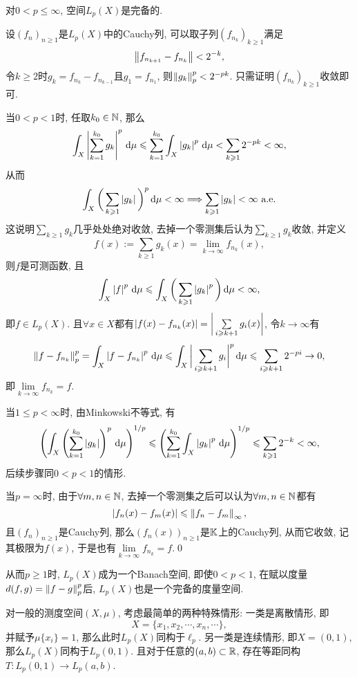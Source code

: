 	\begin{Theorem}
	对$ 0<p\leqslant\infty $, 空间$ L_p(X) $是完备的.
	\end{Theorem}
	\begin{Proof}
	设$ (f_n)_{n\geqslant 1} $是$ L_p(X) $中的Cauchy列, 可以取子列$ (f_{n_k})_{k\geqslant 1} $满足
	\[
	\left\| f_{n_{k+1}}-f_{n_k} \right\|<2^{-k},
	\]
	令$ k\geqslant 2 $时$ g_k=f_{n_k}-f_{n_{k-1}} $且$ g_1=f_{n_1} $, 则$ \left\| g_k \right\|_p^p<2^{-pk} $. 只需证明$ (f_{n_k})_{k\geqslant 1} $收敛即可.
	
	当$ 0<p<1 $时, 任取$ k_0\in\mathbb{N} $, 那么
	\[
	\int_X\left| \sum_{k=1}^{k_0}g_k \right| ^p\,\mathrm{d}\mu\leqslant\sum_{k=1}^{k_0}\int_X\left| g_k \right| ^p\,\mathrm{d}\mu<\sum_{k\geqslant 1}2^{-pk}<\infty,
	\]
	从而
	\[
	\int_X\bigg(\sum_{k\geqslant 1}\left| g_k \right| \bigg)^p\,\mathrm{d}\mu<\infty\Longrightarrow\sum_{k\geqslant 1}\left| g_k \right| <\infty\ \text{a.e.}
	\]
	这说明$ \sum\limits_{k\geqslant 1}g_k $几乎处处绝对收敛, 去掉一个零测集后认为$ \sum\limits_{k\geqslant 1}g_{k} $收敛, 并定义
	\[
	f(x):=\sum_{k\geqslant 1}g_k(x)=\lim_{k\to\infty}f_{n_k}(x),
	\]
	则$ f $是可测函数, 且
	\[
	\int_X\left| f \right| ^p\,\mathrm{d}\mu\leqslant\int_X\bigg(\sum_{k\geqslant 1}\left| g_k \right| ^p\bigg)\,\mathrm{d} \mu<\infty,
	\]
	即$ f\in L_p(X) $. 且$ \forall x\in X $都有$ \left| f(x)-f_{n_k}(x) \right| =\bigg|\sum\limits_{i\geqslant k+1}g_i(x)\bigg| $, 令$ k\to\infty $有
	\[
	\left\| f-f_{n_k} \right\|_p^p=\int_X\left| f-f_{n_k} \right| ^p\,\mathrm{d}\mu\leqslant\int_X\bigg|\sum_{i\geqslant k+1}g_i\bigg|^p\,\mathrm{d}\mu\leqslant\sum_{i\geqslant k+1}2^{-pi}\to 0,
	\]
	即$ \lim\limits_{k\to\infty}f_{n_{k}}=f $.
	
	当$ 1\leqslant p<\infty $时, 由Minkowski不等式, 有
	\[
	\left( \int_X\left( \sum_{k=1}^{k_0}\left| g_k \right|  \right)^p\,\mathrm{d}\mu \right)^{1/p}\leqslant\left( \sum_{k=1}^{k_0}\int_X\left| g_k \right| ^p\,\mathrm{d}\mu \right)^{1/p}\leqslant\sum_{k\geqslant 1}2^{-k}<\infty,
	\]
	后续步骤同$ 0<p<1 $的情形.
	
	当$ p=\infty $时, 由于$ \forall m,n\in\mathbb{N} $, 去掉一个零测集之后可以认为$ \forall m,n\in\mathbb{N} $都有
	\[
	\left| f_n(x)-f_m(x) \right| \leqslant\left\| f_n-f_m \right\|_\infty,
	\]
	且$ (f_n)_{n\geqslant 1} $是Cauchy列, 那么$ (f_n(x))_{n\geqslant 1} $是$ \mathbb{K} $上的Cauchy列, 从而它收敛, 记其极限为$ f(x) $, 于是也有$ \lim\limits_{k\to\infty}f_{n_k}=f $.\qed
	\end{Proof}
	
     从而$ p\geqslant 1 $时, $ L_p(X) $成为一个Banach空间, 即使$ 0<p<1 $, 在赋以度量$ d(f,g)=\left\| f-g \right\|_p^p $后, $ L_p(X) $也是一个完备的度量空间.
     
     对一般的测度空间$ (X,\mu) $, 考虑最简单的两种特殊情形: 一类是离散情形, 即
	\[
	X=\{ x_1,x_2,\cdots,x_n,\cdots \},
	\]
	并赋予$ \mu\{x_i\}=1 $, 那么此时$ L_p(X) $同构于$ \ell_p $. 另一类是连续情形, 即$ X=(0,1) $, 那么$ L_p(X) $同构于$ L_p(0,1) $. 且对于任意的$ (a,b)\subset\mathbb{R} $, 存在等距同构$ T : L_p(0,1)\to L_p(a,b) $.
	
